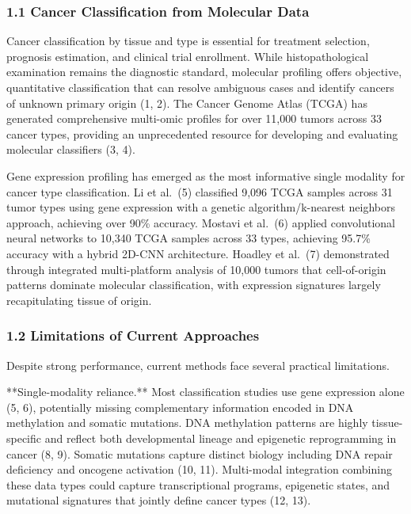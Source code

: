 \subsubsection{1.1 Cancer Classification from Molecular
Data}\label{cancer-classification-from-molecular-data}

Cancer classification by tissue and type is essential for treatment
selection, prognosis estimation, and clinical trial enrollment. While
histopathological examination remains the diagnostic standard, molecular
profiling offers objective, quantitative classification that can resolve
ambiguous cases and identify cancers of unknown primary origin (1, 2).
The Cancer Genome Atlas (TCGA) has generated comprehensive multi-omic
profiles for over 11,000 tumors across 33 cancer types, providing an
unprecedented resource for developing and evaluating molecular
classifiers (3, 4).

Gene expression profiling has emerged as the most informative single
modality for cancer type classification. Li et al.~(5) classified 9,096
TCGA samples across 31 tumor types using gene expression with a genetic
algorithm/k-nearest neighbors approach, achieving over 90\% accuracy.
Mostavi et al.~(6) applied convolutional neural networks to 10,340 TCGA
samples across 33 types, achieving 95.7\% accuracy with a hybrid 2D-CNN
architecture. Hoadley et al.~(7) demonstrated through integrated
multi-platform analysis of 10,000 tumors that cell-of-origin patterns
dominate molecular classification, with expression signatures largely
recapitulating tissue of origin.

\subsubsection{1.2 Limitations of Current
Approaches}\label{limitations-of-current-approaches}

Despite strong performance, current methods face several practical
limitations.

**Single-modality reliance.** Most classification studies use gene
expression alone (5, 6), potentially missing complementary information
encoded in DNA methylation and somatic mutations. DNA methylation
patterns are highly tissue-specific and reflect both developmental
lineage and epigenetic reprogramming in cancer (8, 9). Somatic mutations
capture distinct biology including DNA repair deficiency and oncogene
activation (10, 11). Multi-modal integration combining these data types
could capture transcriptional programs, epigenetic states, and
mutational signatures that jointly define cancer types (12, 13).


